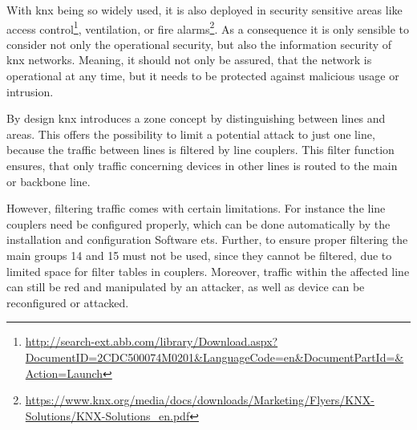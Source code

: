 With \gls{knx} being so widely used, it is also deployed in security sensitive areas like access control\footnote{\url{http://search-ext.abb.com/library/Download.aspx?DocumentID=2CDC500074M0201&LanguageCode=en&DocumentPartId=&Action=Launch}}, ventilation, or fire alarms\footnote{\url{https://www.knx.org/media/docs/downloads/Marketing/Flyers/KNX-Solutions/KNX-Solutions_en.pdf}}.
As a consequence it is only sensible to consider not only the operational security, but also the information security of \gls{knx} networks. Meaning, it should not only be assured, that the network is operational at any time, but it needs to be protected against malicious usage or intrusion.

By design \gls{knx} introduces a zone concept by distinguishing between lines and areas.
This offers the possibility to limit a potential attack to just one line, because the traffic between lines is filtered by line couplers.
This filter function ensures, that only traffic concerning devices in other lines is routed to the main or backbone line.

However, filtering traffic comes with certain limitations. For instance the line couplers need be configured properly, which can be done automatically by the installation and configuration Software \gls{ets}. \parencite{Merz2009}
Further, to ensure proper filtering the main groups 14 and 15 must not be used, since they cannot be filtered, due to limited space for filter tables in couplers. \parencite{Hubner2009}
Moreover, traffic within the affected line can still be red and manipulated by an attacker, as well as device can be reconfigured or attacked.

